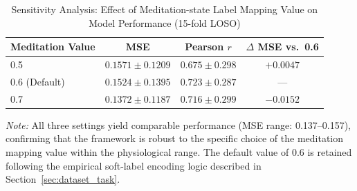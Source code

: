\documentclass{article}
\begin{document}
\begin{table}[htbp]
\centering
\caption{Sensitivity Analysis: Effect of Meditation-state Label Mapping Value on Model Performance (15-fold LOSO)}
\label{tab:sensitivity}
\begin{tabular}{lccc}
\toprule
\textbf{Meditation Value} & \textbf{MSE} & \textbf{Pearson $r$} & \textbf{$\Delta$ MSE vs.\ 0.6} \\
\midrule
0.5 & $0.1571 \pm 0.1209$ & $0.675 \pm 0.298$ & $+0.0047$ \\
0.6 (Default) & $0.1524 \pm 0.1395$ & $0.723 \pm 0.287$ & --- \\
0.7 & $0.1372 \pm 0.1187$ & $0.716 \pm 0.299$ & $-0.0152$ \\
\bottomrule
\end{tabular}
\vspace{0.5em}

\footnotesize{
\textit{Note:} All three settings yield comparable performance (MSE range: 0.137--0.157), confirming that the framework is robust to the specific choice of the meditation mapping value within the physiological range. The default value of 0.6 is retained following the empirical soft-label encoding logic described in Section~\ref{sec:dataset_task}.
}
\end{table}
\end{document}

